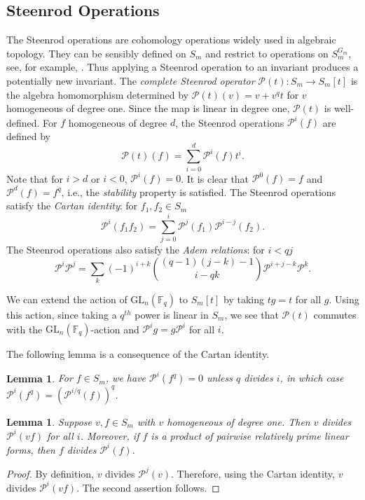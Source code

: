 \documentclass{amsart}
\newcommand{\field}{\mathbb{F}}
\newcommand{\gl}[2]{{{\text{GL}_{{#1}}(\field_{#2})}}}
\newcommand{\invring}{S_m^{G_m}}
\newcommand{\PP}{\mathcal{P}}
\newtheorem{lem}[subsection]{Lemma}
\begin{document}
\subsection{Steenrod Operations} \label{st_sec}

The Steenrod operations are cohomology operations widely used in algebraic topology.
They can be sensibly defined on $S_m$ and restrict
to operations on $\invring$,  see, for example, \cite{smith-algintrosteenrod:07}. 
Thus applying a Steenrod operation to an invariant produces a potentially new invariant.
The {\it complete Steenrod operator} $\PP(t):S_m\to S_m[t]$ is the algebra homomorphism determined by $\PP(t)(v)=v+v^q t$ for $v$ homogeneous of degree one. Since the map is linear in degree one, $\PP(t)$ is well-defined. For $f$ homogeneous of degree $d$, the Steenrod operations 
$\PP^i(f)$ are defined by
$$\PP(t)(f)=\sum_{i=0}^d\PP^i(f)t^i.$$
Note that for $i>d$ or $i<0$, $\PP^i(f)=0$.
It is clear that $\PP^0(f)=f$ and $\PP^d(f)=f^q$,
i.e., the {\it stability} property is satisfied.
The Steenrod operations satisfy the {\it Cartan identity}:
for $f_1,f_2\in S_m$
$$\PP^i(f_1f_2)=\sum_{j=0}^i \PP^{j}(f_1)\PP^{i-j}(f_2).$$
The Steenrod operations also satisfy the {\it Adem relations}: 
for $i<qj$
$$\PP^i\PP^j=\sum_k (-1)^{i+k}
\binom{(q-1)(j-k) -1}{i-qk}\PP^{i+j-k}\PP^{k}.$$

We can extend the action of $\gl{n}{q}$ to $S_m[t]$
by taking $tg=t$ for all $g$. Using this action,
since taking a $q^{th}$ power is linear in $S_m$, 
we see that $\PP(t)$ commutes with the $\gl{n}{q}$-action
and $\PP^ig=g\PP^i$ for all $i$.


The following lemma is a consequence of the Cartan identity.

\begin{lem}\label{steenrod on q powers} For $f\in S_m$, we have $\PP^i(f^q)=0$ unless $q$ divides $i$,
in which case $\PP^i(f^q)=(\PP^{i/q}(f))^q$.
\end{lem}

\begin{lem}\label{steenrod on linear forms}
    Suppose $v,f\in S_m$ with $v$ homogeneous of degree one.
    Then $v$ divides $\PP^i(vf)$ for all $i$. Moreover, if $f$ is a product of pairwise relatively prime linear forms, then $f$ divides $\PP^i(f)$.
\end{lem}
\begin{proof}
    By definition, $v$ divides $\PP^j(v)$. Therefore, using the Cartan identity, $v$ divides $\PP^i(vf)$.  The second assertion follows.
\end{proof}
\end{document}
